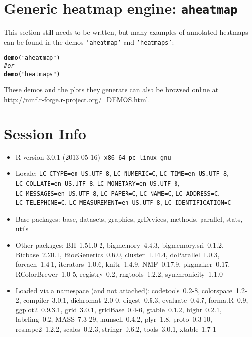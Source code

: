 \documentclass[a4paper]{article}\usepackage[]{graphicx}\usepackage[]{color}
\makeatletter
\newcommand{\hlstr}[1]{\textcolor[rgb]{0.192,0.494,0.8}{#1}}%
\newcommand{\hlcom}[1]{\textcolor[rgb]{0.678,0.584,0.686}{\textit{#1}}}%
\newcommand{\hlstd}[1]{\textcolor[rgb]{0.345,0.345,0.345}{#1}}%
\newcommand{\hlkwd}[1]{\textcolor[rgb]{0.737,0.353,0.396}{\textbf{#1}}}%
\newenvironment{kframe}{%
 \def\at@end@of@kframe{}%
 \ifinner\ifhmode%
  \def\at@end@of@kframe{\end{minipage}}%
  \begin{minipage}{\columnwidth}%
 \fi\fi%
 \def\FrameCommand##1{\hskip\@totalleftmargin \hskip-\fboxsep
 \colorbox{shadecolor}{##1}\hskip-\fboxsep
     \hskip-\linewidth \hskip-\@totalleftmargin \hskip\columnwidth}%
 \MakeFramed {\advance\hsize-\width
   \@totalleftmargin\z@ \linewidth\hsize
   \@setminipage}}%
 {\par\unskip\endMakeFramed%
 \at@end@of@kframe}
\newenvironment{knitrout}{}{} %
\let\code=\texttt
\makeatother
\begin{document}
\section{Generic heatmap engine: \texttt{aheatmap}}
\label{sec:aheatmap}

This section still needs to be written, but many examples of annotated heatmaps can be found in the demos \code{'aheatmap'} and \code{'heatmaps'}:
\begin{knitrout}
\color{fgcolor}\begin{kframe}
\begin{alltt}
\hlkwd{demo}\hlstd{(}\hlstr{"aheatmap"}\hlstd{)}
\hlcom{# or}
\hlkwd{demo}\hlstd{(}\hlstr{"heatmaps"}\hlstd{)}
\end{alltt}
\end{kframe}
\end{knitrout}


These demos and the plots they generate can also be browsed online at \url{http://nmf.r-forge.r-project.org/_DEMOS.html}.

\section{Session Info}
\begin{itemize}\raggedright
  \item R version 3.0.1 (2013-05-16), \verb|x86_64-pc-linux-gnu|
  \item Locale: \verb|LC_CTYPE=en_US.UTF-8|, \verb|LC_NUMERIC=C|, \verb|LC_TIME=en_US.UTF-8|, \verb|LC_COLLATE=en_US.UTF-8|, \verb|LC_MONETARY=en_US.UTF-8|, \verb|LC_MESSAGES=en_US.UTF-8|, \verb|LC_PAPER=C|, \verb|LC_NAME=C|, \verb|LC_ADDRESS=C|, \verb|LC_TELEPHONE=C|, \verb|LC_MEASUREMENT=en_US.UTF-8|, \verb|LC_IDENTIFICATION=C|
  \item Base packages: base, datasets, graphics, grDevices,
    methods, parallel, stats, utils
  \item Other packages: BH~1.51.0-2, bigmemory~4.4.3,
    bigmemory.sri~0.1.2, Biobase~2.20.1, BiocGenerics~0.6.0,
    cluster~1.14.4, doParallel~1.0.3, foreach~1.4.1,
    iterators~1.0.6, knitr~1.4.9, NMF~0.17.9, pkgmaker~0.17,
    RColorBrewer~1.0-5, registry~0.2, rngtools~1.2.2,
    synchronicity~1.1.0
  \item Loaded via a namespace (and not attached):
    codetools~0.2-8, colorspace~1.2-2, compiler~3.0.1,
    dichromat~2.0-0, digest~0.6.3, evaluate~0.4.7, formatR~0.9,
    ggplot2~0.9.3.1, grid~3.0.1, gridBase~0.4-6, gtable~0.1.2,
    highr~0.2.1, labeling~0.2, MASS~7.3-29, munsell~0.4.2,
    plyr~1.8, proto~0.3-10, reshape2~1.2.2, scales~0.2.3,
    stringr~0.6.2, tools~3.0.1, xtable~1.7-1
\end{itemize}



\printbibliography[heading=bibintoc]
\end{document}
